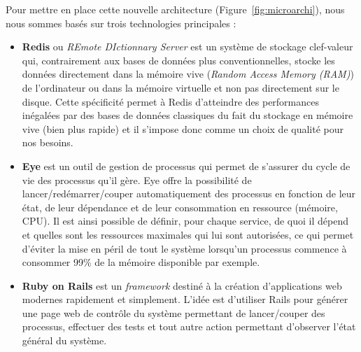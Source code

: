 Pour mettre en place cette nouvelle architecture (Figure~\ref{fig:microarchi}), nous nous sommes basés sur trois technologies principales :
\begin{itemize}
\item \textbf{Redis}\cite{redis} ou \emph{REmote DIctionnary Server} est un système de stockage clef-valeur qui, contrairement aux bases de données plus conventionnelles, stocke les données directement dans la mémoire vive (\emph{Random Access Memory (RAM)}) de l'ordinateur ou dans la mémoire virtuelle et non pas directement sur le disque. Cette spécificité permet à Redis d'atteindre des performances inégalées par des bases de données classiques du fait du stockage en mémoire vive (bien plus rapide) et il s'impose donc comme un choix de qualité pour nos besoins.
\item \textbf{Eye}\cite{eye} est un outil de gestion de processus qui permet de s'assurer du cycle de vie des processus qu'il gère. Eye offre la possibilité de lancer/redémarrer/couper automatiquement des processus en fonction de leur état, de leur dépendance et de leur consommation en ressource (mémoire, CPU). Il est ainsi possible de définir, pour chaque service, de quoi il dépend et quelles sont les ressources maximales qui lui sont autorisées, ce qui permet d'éviter la mise en péril de tout le système lorsqu'un processus commence à consommer 99\% de la mémoire disponible par exemple.
\item \textbf{Ruby on Rails}\cite{rubyrails} est un \emph{framework} destiné à la création d'applications web modernes rapidement et simplement. L'idée est d'utiliser Rails pour générer une page web de contrôle du système permettant de lancer/couper des processus, effectuer des tests et tout autre action permettant d'observer l'état général du système.
\end{itemize}

